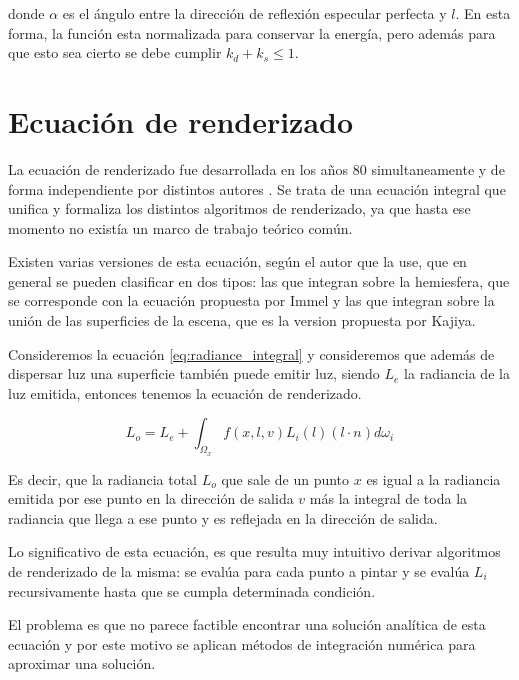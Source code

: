 donde $\alpha$ es el ángulo entre la dirección de reflexión especular perfecta y $l$.
En esta forma, la función esta normalizada para conservar la energía, pero además para que esto sea cierto se debe cumplir $k_d + k_s \leq 1$.



\clearpage

\section{Ecuación de renderizado}

La ecuación de renderizado fue desarrollada en los años 80 simultaneamente y de forma independiente por distintos autores \cite{Kajiya1986, Immel1986}. Se trata de una ecuación integral que unifica y formaliza los distintos algoritmos de renderizado, ya que hasta ese momento no existía un marco de trabajo teórico común.

\medskip
Existen varias versiones de esta ecuación, según el autor que la use, que en general se pueden clasificar en dos tipos: las que integran sobre la hemiesfera, que se corresponde con la ecuación propuesta por Immel y las que integran sobre la unión de las superficies de la escena, que es la version propuesta por Kajiya.
\medskip

Consideremos la ecuación \ref{eq:radiance_integral}  y consideremos que además de dispersar luz una superficie también puede emitir luz, siendo $L_e$ la radiancia de la luz emitida, entonces tenemos la ecuación de renderizado.

\begin{equation}
L _ o = L_e + \int_{\Omega_x} f(x, l, v) L_i(l) (l \cdot n) d\omega_i 
\end{equation}

Es decir, que la radiancia total $L_o$ que sale de un punto $x$ es igual a la radiancia emitida por ese punto en la dirección de salida $v$ más la integral de toda la radiancia que llega a ese punto y es reflejada en la dirección de salida.
\medskip

Lo significativo de esta ecuación, es que resulta muy intuitivo derivar algoritmos de renderizado de la misma: se evalúa para cada punto a pintar y se evalúa $L_i$ recursivamente hasta que se cumpla determinada condición.
\medskip

El problema es que no parece factible encontrar una solución analítica de esta ecuación y por este motivo se aplican métodos de integración numérica para aproximar una solución.

